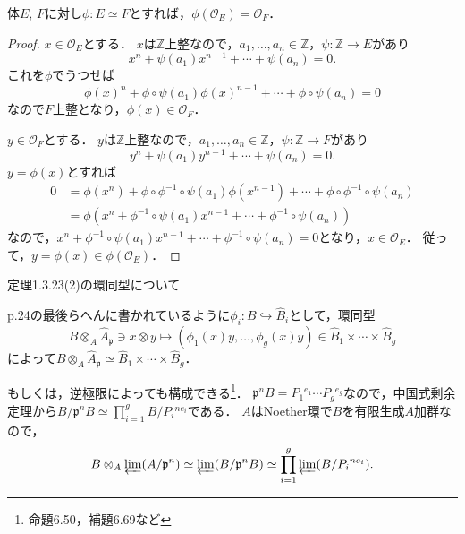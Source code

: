 \begin{screen}
  \begin{lem}
    \label{iso_field_integral_closure}
    体$E$, $F$に対し$\phi \colon E \simeq F$とすれば，$\phi(\mathcal{O}_E) = \mathcal{O}_F$．
  \end{lem}
\end{screen}
\begin{proof}
  $x\in \mathcal{O}_E$とする．
  $x$は$\mathbb{Z}$上整なので，$a_1, \ldots, a_n \in \mathbb{Z}$，$\psi\colon\mathbb{Z}\to E$があり
  \[x^n + \psi(a_1)x^{n-1} + \cdots + \psi(a_n) = 0.\]
  これを$\phi$でうつせば
  \[\phi(x)^n + \phi\circ\psi(a_1)\phi(x)^{n-1} + \cdots + \phi\circ\psi(a_n) = 0\]
  なので$F$上整となり，$\phi(x) \in \mathcal{O}_F$．

  $y \in \mathcal{O}_F$とする．
  $y$は$\mathbb{Z}$上整なので，$a_1, \ldots, a_n \in \mathbb{Z}$，$\psi\colon\mathbb{Z}\to F$があり
  \[y^n + \psi(a_1)y^{n-1} + \cdots + \psi(a_n) = 0.\]
  $y = \phi(x)$とすれば
  \begin{align*}
    0 &= \phi(x^n) + \phi\circ\phi^{-1}\circ\psi(a_1) \phi(x^{n-1}) + \cdots + \phi\circ\phi^{-1}\circ\psi(a_n) \\
      &= \phi \left( x^n + \phi^{-1}\circ\psi(a_1) x^{n-1} + \cdots + \phi^{-1}\circ\psi(a_n) \right)
  \end{align*}
  なので，$x^n + \phi^{-1}\circ\psi(a_1) x^{n-1} + \cdots + \phi^{-1}\circ\psi(a_n) = 0$となり，$x \in \mathcal{O}_E$．
  従って，$y = \phi(x) \in \phi(\mathcal{O}_E)$．
\end{proof}

\begin{screen}
  \begin{thm}
    \label{Thm_1_3_23_2}
    定理1.3.23(2)の環同型について
  \end{thm}
\end{screen}
p.24の最後らへんに書かれているように$\phi_i\colon B\hookrightarrow\widehat{B}_i$として，環同型
\[B\otimes_A\widehat{A}_\mathfrak{p}\ni x \otimes y\mapsto(\phi_1(x)y, \ldots, \phi_g(x)y)\in\widehat{B}_1\times\cdots\times\widehat{B}_g\]
によって$B\otimes_A\widehat{A}_\mathfrak{p}\simeq\widehat{B}_1\times\cdots\times\widehat{B}_g$．

もしくは，逆極限によっても構成できる\footnote{\cite{加藤和也2005数論}命題6.50，補題6.69など}．
$\mathfrak{p}^nB = P_1{}^{e_1} \cdots P_g{}^{e_g}$なので，中国式剰余定理から$B/\mathfrak{p}^nB \simeq \prod_{i = 1}^g B/P_i{}^{ne_i}$である．
$A$はNoether環で$B$を有限生成$A$加群なので，
\[ B \otimes_A \varprojlim (A/\mathfrak{p}^n) \simeq \varprojlim(B/\mathfrak{p}^nB) \simeq \prod_{i = 1}^g \varprojlim (B/P_i{}^{ne_i}). \]

